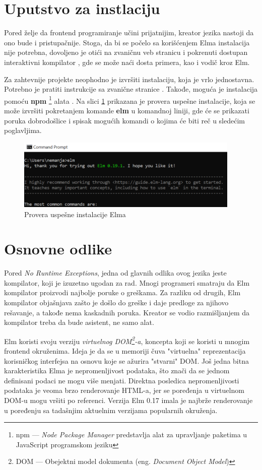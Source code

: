 \documentclass[12pt,oneside]{memoir}
\begin{document}
\section{Uputstvo za instlaciju}
Pored želje da frontend programiranje učini prijatnijim, kreator jezika nastoji 
da ono bude i pristupačnije. Stoga, da bi se počelo sa korišćenjem Elma instalacija 
nije potrebna, dovoljeno je otići na zvaničnu veb stranicu i pokrenuti dostupan 
interaktivni kompilator \cite{tryelm}, gde se može naći dosta primera, kao i vodič kroz Elm.

Za zahtevnije projekte neophodno je izvršiti instalaciju, koja je vrlo
jednostavna. Potrebno je pratiti instrukcije sa zvanične stranice
\cite{installelm}. Takođe, moguća je instalacija pomoću \textbf{npm}
\footnote{npm --- \emph{Node Package Manager} predstavlja alat za upravljanje paketima u 
JavaScript programskom jeziku} alata \cite{npm}.
Na slici \ref{fig:elm-cmd} prikazana je provera uspešne instalacije, koja se može izvršiti
pokretanjem komande \textbf{elm} u komandnoj liniji, gde će se prikazati poruka
dobrodošlice i spisak mogućih komandi o kojima će biti reč u sledećim poglavljima.
\begin{figure}[!ht]
  \centering
  \includegraphics[width=0.95\textwidth]{elm-cmd.png}
  \caption{Provera uspešne instalacije Elma}
  \label{fig:elm-cmd}
\end{figure}

\section{Osnovne odlike}
Pored \emph{No Runtime Exceptions}, jedna od glavnih odlika ovog jezika jeste
kompilator, koji je izuzetno ugodan za rad. Mnogi programeri smatraju da Elm
kompilator proizvodi najbolje poruke o greškama. Za razliku od drugih, Elm
kompilator objašnjava zašto je došlo do greške i daje predloge za njihovo rešavanje,
a takođe nema kaskadnih poruka. Kreator se vodio razmišljanjem da kompilator treba
da bude asistent, ne samo alat.

Elm koristi svoju verziju \emph{virtuelnog DOM\footnote{DOM --- Obejektni model
dokumenta (eng. \emph{Document Object Model})\cite{dom}}-a}, koncepta koji se koristi u mnogim
frontend okruženima. Ideja je da se u memoriji čuva "virtuelna" reprezentacija
korisničkog interfejsa na osnovu koje se ažurira "stvarni" DOM. Još jedna bitna
karakteristika Elma je nepromenljivost podataka, što znači da se jednom definisani
podaci ne mogu više menjati. Direktna posledica nepromenljivosti podataka je veoma
brzo renderovanje HTML-a, jer se poređenja u virtuelnom DOM-u mogu vršiti po referenci. 
Verzija Elm 0.17 imala je najbrže renderovanje u poređenju sa tadašnjim aktuelnim verzijama 
popularnih okruženja\cite{elm-html}.
\end{document}
